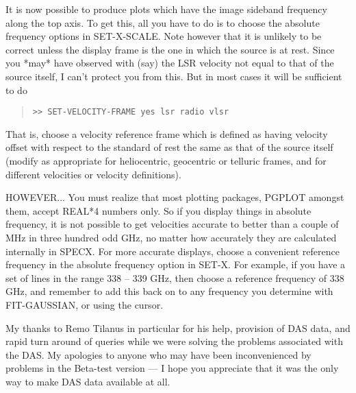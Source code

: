 \documentclass[twoside,11pt]{article}
\renewcommand{\_}{\texttt{\symbol{95}}}
\newenvironment{myquote}{\begin{quote}\begin{small}}{\end{small}\end{quote}}
\begin{document}
It is now possible to produce plots which have the image sideband 
frequency along the top axis. To get this, all you have to do is to
choose the absolute frequency options in SET-X-SCALE. Note however 
that it is unlikely to be correct unless the display frame is the one
in which the source is at rest. Since you *may* have observed with
(say) the LSR velocity not equal to that of the source itself, I can't
protect you from this. But in most cases it will be sufficient to do
\begin{myquote}
\begin{verbatim}
>> SET-VELOCITY-FRAME yes lsr radio vlsr
\end{verbatim}
\end{myquote}
That is, choose a velocity reference frame which is defined as having
velocity offset with respect to the standard of rest the same as that
of the source itself (modify as appropriate for heliocentric,
geocentric or telluric frames, and for different velocities or velocity
definitions).

HOWEVER... You must realize that most plotting packages, PGPLOT
amongst them, accept REAL*4 numbers only. So if you display things in
absolute frequency, it is not possible to get velocities accurate to
better than a couple of MHz in three hundred odd GHz, no matter how
accurately they are calculated internally in SPECX. For more accurate
displays, choose a convenient reference frequency in the absolute
frequency option in SET-X. For  example, if you have a set of lines 
in the range 338 -- 339 GHz, then choose a reference frequency of
338 GHz, and remember to add this back on to any frequency you determine
with FIT-GAUSSIAN, or using the cursor.

My thanks to Remo Tilanus in particular for his help,
provision of DAS data, and rapid turn around of queries while we
were solving the problems associated with the DAS. My apologies to
anyone who may have been inconvenienced by problems in the Beta-test
version --- I hope you appreciate that it was the only way to make
DAS data available at all.
\end{document}
